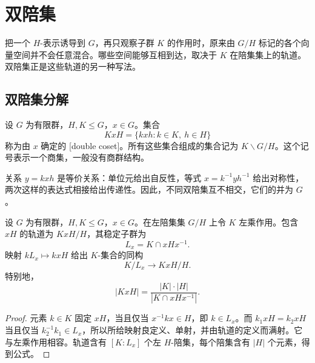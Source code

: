 

\section{双陪集}
\label{b5:sec:0401}

把一个 \(H\)-表示诱导到 \(G\)，再只观察子群 \(K\) 的作用时，原来由 \(G/H\) 标记的各个向量空间并不会任意混合。哪些空间能够互相到达，取决于 \(K\) 在陪集集上的轨道。双陪集正是这些轨道的另一种写法。

\subsection{双陪集分解}
\label{b5:subsec:0401:01}

\begin{definition}\label{b5:def:double-coset}
	设 \(G\) 为有限群，\(H,K\leq G\)，\(x\in G\)。集合
	\[
		KxH=\{kxh:k\in K,\ h\in H\}
	\]
	称为由 \(x\) 确定的 [double coset]。所有这些集合组成的集合记为 \(K\backslash G/H\)。这个记号表示一个商集，一般没有商群结构。
\end{definition}

关系 \(y=kxh\) 是等价关系：单位元给出自反性，等式 \(x=k^{-1}yh^{-1}\) 给出对称性，两次这样的表达式相接给出传递性。因此，不同双陪集互不相交，它们的并为 \(G\)。

\begin{proposition}\label{b5:prop:double-coset-orbits}
	设 \(G\) 为有限群，\(H,K\leq G\)，\(x\in G\)。在左陪集集 \(G/H\) 上令 \(K\) 左乘作用。包含 \(xH\) 的轨道为 \(KxH/H\)，其稳定子群为
	\[
		L_x=K\cap xHx^{-1}.
	\]
	映射 \(kL_x\mapsto kxH\) 给出 \(K\)-集合的同构
	\[
		K/L_x\longrightarrow KxH/H.
	\]
	特别地，
	\begin{equation}\label{b5:eq:double-coset-size}
		|KxH|=\frac{|K|\cdot|H|}{|K\cap xHx^{-1}|}.
	\end{equation}
\end{proposition}
\begin{proof}
	元素 \(k\in K\) 固定 \(xH\)，当且仅当 \(x^{-1}kx\in H\)，即 \(k\in L_x\)。而 \(k_1xH=k_2xH\) 当且仅当 \(k_2^{-1}k_1\in L_x\)，所以所给映射良定义、单射，并由轨道的定义而满射。它与左乘作用相容。轨道含有 \([K:L_x]\) 个左 \(H\)-陪集，每个陪集含有 \(|H|\) 个元素，得到公式。
\end{proof}

